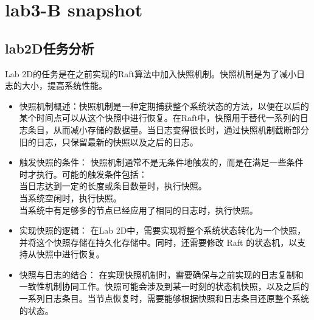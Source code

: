 \documentclass[]{article}
\begin{document}
	\section{lab3-B snapshot}
	\subsection{lab2D任务分析}
	Lab 2D的任务是在之前实现的Raft算法中加入快照机制。快照机制是为了减小日志的大小，提高系统性能。
	
	\begin{itemize}
		\item 快照机制概述：快照机制是一种定期捕获整个系统状态的方法，以便在以后的某个时间点可以从这个快照中进行恢复。在Raft中，快照用于替代一系列的日志条目，从而减小存储的数据量。当日志变得很长时，通过快照机制截断部分旧的日志，只保留最新的快照以及之后的日志。
		\item 触发快照的条件： 快照机制通常不是无条件地触发的，而是在满足一些条件时才执行。可能的触发条件包括：\\
		当日志达到一定的长度或条目数量时，执行快照。\\
		当系统空闲时，执行快照。\\
		当系统中有足够多的节点已经应用了相同的日志时，执行快照。
		
		\item 实现快照的逻辑： 在Lab 2D中，需要实现将整个系统状态转化为一个快照，并将这个快照存储在持久化存储中。同时，还需要修改 Raft 的状态机，以支持从快照中进行恢复。
		
		\item 快照与日志的结合： 在实现快照机制时，需要确保与之前实现的日志复制和一致性机制协同工作。快照可能会涉及到某一时刻的状态机快照，以及之后的一系列日志条目。当节点恢复时，需要能够根据快照和日志条目还原整个系统的状态。
	\end{itemize}
\end{document}
